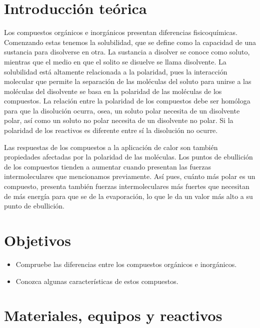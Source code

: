 
\section{Introducción teórica}

Los compuestos orgánicos e inorgánicos presentan diferencias fisicoquímicas. Comenzando estas tenemos la solubilidad, que se define como la capacidad de una sustancia para disolverse en otra. La sustancia a disolver se conoce como soluto, mientras que el medio en que el solito se disuelve se llama disolvente. La solubilidad está altamente relacionada a la polaridad, pues la interacción molecular que permite la separación de las moléculas del soluto para unirse a las moléculas del disolvente se basa en la polaridad de las moléculas de los compuestos. La relación entre la polaridad de los compuestos debe ser homóloga para que la disolución ocurra, osea, un soluto polar necesita de un disolvente polar, así como un soluto no polar necesita de un disolvente no polar. Si la polaridad de los reactivos es diferente entre sí la disolución no ocurre.

Las respuestas de los compuestos a la aplicación de calor son también propiedades afectadas por la polaridad de las moléculas. Los puntos de ebullición de los compuestos tienden a aumentar cuando presentan las fuerzas intermoleculares que mencionamos previamente. Así pues, cuánto más polar es un compuesto, presenta también fuerzas intermoleculares más fuertes que necesitan de más energía para que se de la evaporación, lo que le da un valor más alto a su punto de ebullición.\citep{troChemistryStructureProperties2015}

\section{Objetivos}

\begin{itemize}
    \item Compruebe las diferencias entre los compuestos orgánicos e inorgánicos.
    \item Conozca algunas características de estos compuestos.
\end{itemize}

\section{Materiales, equipos y reactivos}

